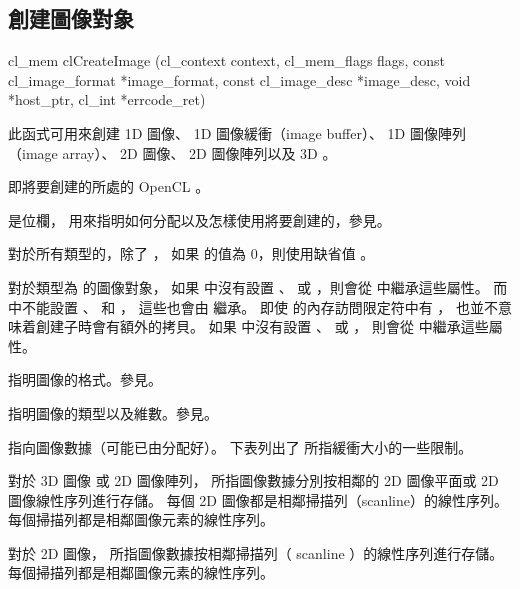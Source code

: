 \subsection{創建圖像對象}


\startCLFUNC
cl_mem clCreateImage (cl_context context,
		cl_mem_flags flags,
		const cl_image_format *image_format,
		const cl_image_desc *image_desc,
		void *host_ptr,
		cl_int *errcode_ret)
\stopCLFUNC

此函式可用來創建 1D 圖像、 1D 圖像緩衝（image buffer）、 1D 圖像陣列（image array）、
2D 圖像、 2D 圖像陣列以及 3D 。

 即將要創建的所處的 OpenCL 。

 是位欄，
用來指明如何分配以及怎樣使用將要創建的，參見。

對於所有類型的，除了 ，
如果  的值為 0，則使用缺省值 。

對於類型為  的圖像對象，
如果  中沒有設置 、 
或 ，則會從  中繼承這些屬性。
而  中不能設置 、
 和 ，
這些也會由  繼承。
即使  的內存訪問限定符中有 ，
也並不意味着創建子時會有額外的拷貝。
如果  中沒有設置 、
 或 ，
則會從  中繼承這些屬性。

 指明圖像的格式。參見。

 指明圖像的類型以及維數。參見。

 指向圖像數據（可能已由分配好）。
下表列出了  所指緩衝大小的一些限制。



對於 3D 圖像 或 2D 圖像陣列，
 所指圖像數據分別按相鄰的 2D 圖像平面或 2D 圖像線性序列進行存儲。
每個 2D 圖像都是相鄰掃描列（scanline）的線性序列。
每個掃描列都是相鄰圖像元素的線性序列。

對於 2D 圖像，
 所指圖像數據按相鄰掃描列（ scanline ）的線性序列進行存儲。
每個掃描列都是相鄰圖像元素的線性序列。


